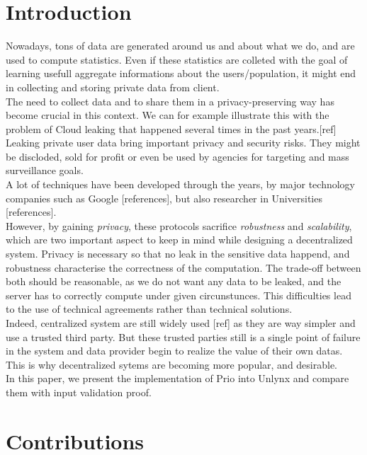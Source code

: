 \documentclass{article}
\begin{document}
\section*{Introduction}
Nowadays, tons of data are generated around us and about what we do, and are used to compute statistics. Even if these statistics are colleted with the goal of learning usefull aggregate informations about the users/population, it might end in collecting and storing private data from client.\\
The need to collect data and to share them in a privacy-preserving way has become crucial in this context.
We can for example illustrate this with the problem of Cloud leaking that happened several times in the past years.[ref]\\
Leaking private user data bring important privacy and security risks. They might be discloded, sold for profit or even be used by agencies for targeting and mass surveillance goals.\\
A lot of techniques have been developed through the years, by major technology companies such as Google [references], but also researcher in Universities [references].\\
However, by gaining \textit{privacy}, these protocols sacrifice \textit{robustness} and \textit{scalability}, which are two important aspect to keep in mind while designing a decentralized system. Privacy is necessary so that no leak in the sensitive data happend, and robustness characterise the correctness of the computation. The trade-off between both should be reasonable, as we do not want any data to be leaked, and the server has to correctly compute under given circunstunces.
This difficulties lead to the use of technical agreements rather than technical solutions.\\
Indeed, centralized system are still widely used [ref] as they are way simpler and use a trusted third party. But these trusted parties still is a single point of failure in the system and data provider begin to realize the value of their own datas.\\
This is why decentralized sytems are becoming more popular, and desirable.\\
In this paper, we present the implementation of Prio into Unlynx and compare them with input validation proof.

\section*{Contributions}
\end{document}
